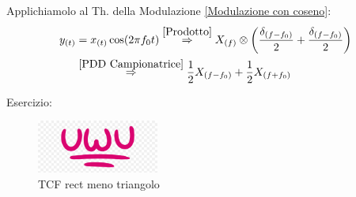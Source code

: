                     Applichiamolo al Th. della Modulazione \ref{Modulazione con coseno}:\\
                    \begin{align}
                        y_{(t)} &= x_{(t)}\cos(2\pi f_0t) \overset{\ref{Prodotto}}{\Rightarrow} X_{(f)}\otimes\left(\frac{\delta_{(f-f_0)}}{2} + \frac{\delta_{(f-f_0)}}{2}\right)\nonumber \\
                                &\overset{\ref{PDD Campionatrice}}{\Rightarrow} \frac{1}{2} X_{(f-f_0)} + \frac{1}{2} X_{(f+f_0)}\nonumber 
                    \end{align}

                    Esercizio:
                    {
                        \begin{figure}[H]
                            \centering
                            \includegraphics[width=4cm]{media/uwu.png}
                            \caption{TCF rect meno triangolo}
                            \label{fig:rect meno triangolo}
                        \end{figure}
                    }
